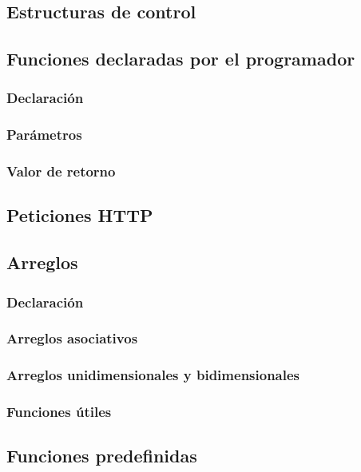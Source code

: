 \documentclass[12pt]{report}
\begin{document}
		\subsection{Estructuras de control}
		\subsection{Funciones declaradas por el programador}
			\subsubsection{Declaración}
			\subsubsection{Parámetros}
			\subsubsection{Valor de retorno}
		\subsection{Peticiones HTTP}
		\subsection{Arreglos}
			\subsubsection{Declaración}
			\subsubsection{Arreglos asociativos}
			\subsubsection{Arreglos unidimensionales y bidimensionales}
			\subsubsection{Funciones útiles}
		\subsection{Funciones predefinidas}
\end{document}
